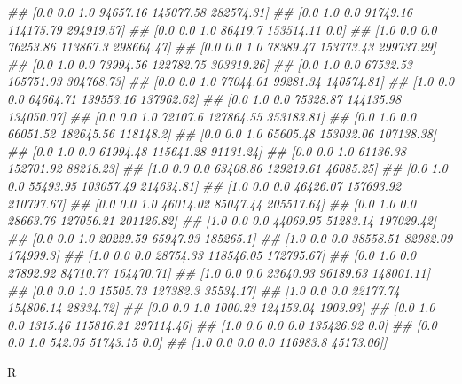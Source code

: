 \documentclass[
]{book}
\newenvironment{Shaded}{\begin{snugshade}}{\end{snugshade}}
\newcommand{\AttributeTok}[1]{\textcolor[rgb]{0.77,0.63,0.00}{#1}}
\newcommand{\CommentTok}[1]{\textcolor[rgb]{0.56,0.35,0.01}{\textit{#1}}}
\newcommand{\DecValTok}[1]{\textcolor[rgb]{0.00,0.00,0.81}{#1}}
\newcommand{\FunctionTok}[1]{\textcolor[rgb]{0.00,0.00,0.00}{#1}}
\newcommand{\NormalTok}[1]{#1}
\newcommand{\OtherTok}[1]{\textcolor[rgb]{0.56,0.35,0.01}{#1}}
\newcommand{\SpecialCharTok}[1]{\textcolor[rgb]{0.00,0.00,0.00}{#1}}
\newcommand{\StringTok}[1]{\textcolor[rgb]{0.31,0.60,0.02}{#1}}
\theoremstyle{definition}
\theoremstyle{definition}
\theoremstyle{definition}
\theoremstyle{definition}
\theoremstyle{remark}
\begin{document}
\begin{Shaded}
\begin{Highlighting}[]
\CommentTok{\#\#  [0.0 0.0 1.0 94657.16 145077.58 282574.31]}
\CommentTok{\#\#  [0.0 1.0 0.0 91749.16 114175.79 294919.57]}
\CommentTok{\#\#  [0.0 0.0 1.0 86419.7 153514.11 0.0]}
\CommentTok{\#\#  [1.0 0.0 0.0 76253.86 113867.3 298664.47]}
\CommentTok{\#\#  [0.0 0.0 1.0 78389.47 153773.43 299737.29]}
\CommentTok{\#\#  [0.0 1.0 0.0 73994.56 122782.75 303319.26]}
\CommentTok{\#\#  [0.0 1.0 0.0 67532.53 105751.03 304768.73]}
\CommentTok{\#\#  [0.0 0.0 1.0 77044.01 99281.34 140574.81]}
\CommentTok{\#\#  [1.0 0.0 0.0 64664.71 139553.16 137962.62]}
\CommentTok{\#\#  [0.0 1.0 0.0 75328.87 144135.98 134050.07]}
\CommentTok{\#\#  [0.0 0.0 1.0 72107.6 127864.55 353183.81]}
\CommentTok{\#\#  [0.0 1.0 0.0 66051.52 182645.56 118148.2]}
\CommentTok{\#\#  [0.0 0.0 1.0 65605.48 153032.06 107138.38]}
\CommentTok{\#\#  [0.0 1.0 0.0 61994.48 115641.28 91131.24]}
\CommentTok{\#\#  [0.0 0.0 1.0 61136.38 152701.92 88218.23]}
\CommentTok{\#\#  [1.0 0.0 0.0 63408.86 129219.61 46085.25]}
\CommentTok{\#\#  [0.0 1.0 0.0 55493.95 103057.49 214634.81]}
\CommentTok{\#\#  [1.0 0.0 0.0 46426.07 157693.92 210797.67]}
\CommentTok{\#\#  [0.0 0.0 1.0 46014.02 85047.44 205517.64]}
\CommentTok{\#\#  [0.0 1.0 0.0 28663.76 127056.21 201126.82]}
\CommentTok{\#\#  [1.0 0.0 0.0 44069.95 51283.14 197029.42]}
\CommentTok{\#\#  [0.0 0.0 1.0 20229.59 65947.93 185265.1]}
\CommentTok{\#\#  [1.0 0.0 0.0 38558.51 82982.09 174999.3]}
\CommentTok{\#\#  [1.0 0.0 0.0 28754.33 118546.05 172795.67]}
\CommentTok{\#\#  [0.0 1.0 0.0 27892.92 84710.77 164470.71]}
\CommentTok{\#\#  [1.0 0.0 0.0 23640.93 96189.63 148001.11]}
\CommentTok{\#\#  [0.0 0.0 1.0 15505.73 127382.3 35534.17]}
\CommentTok{\#\#  [1.0 0.0 0.0 22177.74 154806.14 28334.72]}
\CommentTok{\#\#  [0.0 0.0 1.0 1000.23 124153.04 1903.93]}
\CommentTok{\#\#  [0.0 1.0 0.0 1315.46 115816.21 297114.46]}
\CommentTok{\#\#  [1.0 0.0 0.0 0.0 135426.92 0.0]}
\CommentTok{\#\#  [0.0 0.0 1.0 542.05 51743.15 0.0]}
\CommentTok{\#\#  [1.0 0.0 0.0 0.0 116983.8 45173.06]]}
\end{Highlighting}
\end{Shaded}

R

\begin{Shaded}
\end{Shaded}
\end{document}
